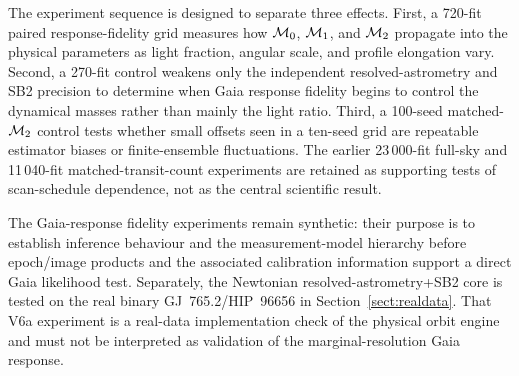 The experiment sequence is designed to separate three effects. First, a 720-fit paired response-fidelity grid measures how $\mathcal{M}_0$, $\mathcal{M}_1$, and $\mathcal{M}_2$ propagate into the physical parameters as light fraction, angular scale, and profile elongation vary. Second, a 270-fit control weakens only the independent resolved-astrometry and SB2 precision to determine when Gaia response fidelity begins to control the dynamical masses rather than mainly the light ratio. Third, a 100-seed matched-$\mathcal{M}_2$ control tests whether small offsets seen in a ten-seed grid are repeatable estimator biases or finite-ensemble fluctuations. The earlier 23\,000-fit full-sky and 11\,040-fit matched-transit-count experiments are retained as supporting tests of scan-schedule dependence, not as the central scientific result.

The Gaia-response fidelity experiments remain synthetic: their purpose is to establish inference behaviour and the measurement-model hierarchy before epoch/image products and the associated calibration information support a direct Gaia likelihood test. Separately, the Newtonian resolved-astrometry+SB2 core is tested on the real binary GJ~765.2/HIP~96656 in Section~\ref{sect:realdata}. That V6a experiment is a real-data implementation check of the physical orbit engine and must not be interpreted as validation of the marginal-resolution Gaia response.
